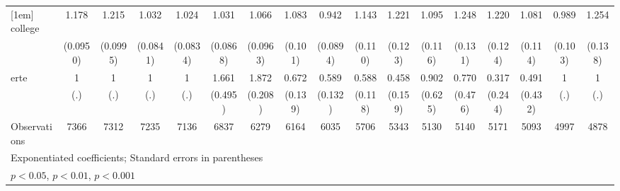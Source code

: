 {\begin{tabular}{l*{16}{c}}
[1em]
college             &       1.178\sym{*}  &       1.215\sym{*}  &       1.032         &       1.024         &       1.031         &       1.066         &       1.083         &       0.942         &       1.143         &       1.221\sym{*}  &       1.095         &       1.248\sym{*}  &       1.220         &       1.081         &       0.989         &       1.254\sym{*}  \\
                    &    (0.0950)         &    (0.0995)         &    (0.0841)         &    (0.0834)         &    (0.0868)         &    (0.0963)         &     (0.101)         &    (0.0894)         &     (0.110)         &     (0.123)         &     (0.116)         &     (0.131)         &     (0.124)         &     (0.114)         &     (0.103)         &     (0.138)         \\
[1em]
erte                &           1         &           1         &           1         &           1         &       1.661         &       1.872\sym{***}&       0.672         &       0.589\sym{*}  &       0.588\sym{**} &       0.458\sym{*}  &       0.902         &       0.770         &       0.317         &       0.491         &           1         &           1         \\
                    &         (.)         &         (.)         &         (.)         &         (.)         &     (0.495)         &     (0.208)         &     (0.139)         &     (0.132)         &     (0.118)         &     (0.159)         &     (0.625)         &     (0.476)         &     (0.244)         &     (0.432)         &         (.)         &         (.)         \\
\hline
Observations        &        7366         &        7312         &        7235         &        7136         &        6837         &        6279         &        6164         &        6035         &        5706         &        5343         &        5130         &        5140         &        5171         &        5093         &        4997         &        4878         \\
\hline\hline
\multicolumn{17}{l}{\footnotesize Exponentiated coefficients; Standard errors in parentheses}\\
\multicolumn{17}{l}{\footnotesize \sym{*} \(p<0.05\), \sym{**} \(p<0.01\), \sym{***} \(p<0.001\)}\\
\end{tabular}
}
